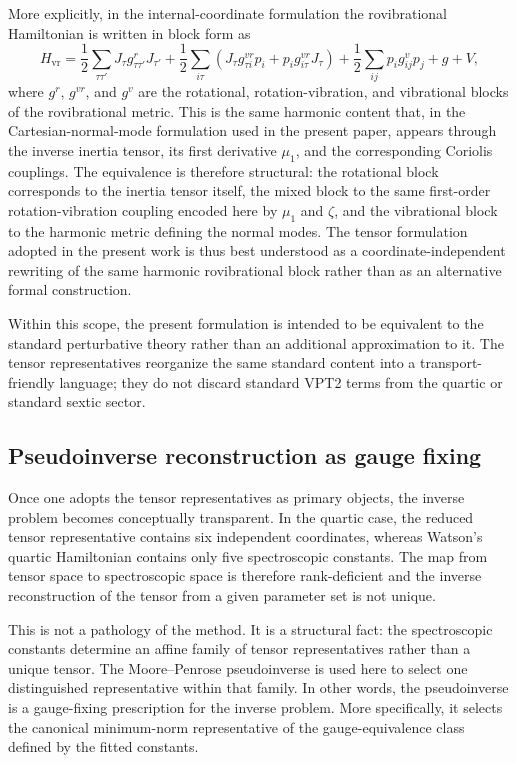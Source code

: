 \documentclass[aip,jcp,reprint,floatfix]{revtex4-2}
\begin{document}
More explicitly, in the internal-coordinate formulation the
rovibrational Hamiltonian is written in block form as
\begin{equation}
H_{\mathrm{vr}}
=
\frac12 \sum_{\tau\tau'} J_\tau g^{r}_{\tau\tau'} J_{\tau'}
+ \frac12 \sum_{i\tau}\left(J_\tau g^{vr}_{\tau i} p_i + p_i g^{vr}_{i\tau} J_\tau\right)
+ \frac12 \sum_{ij} p_i g^{v}_{ij} p_j
+ g + V,
\end{equation}
where $g^r$, $g^{vr}$, and $g^v$ are the rotational,
rotation-vibration, and vibrational blocks of the rovibrational
metric.\cite{cubic-internal_2024} This is the same harmonic
content that, in the Cartesian-normal-mode formulation used in the
present paper, appears through the inverse inertia tensor, its first
derivative $\mu_1$, and the corresponding Coriolis couplings.
The equivalence is therefore structural: the rotational block
corresponds to the inertia tensor itself, the mixed block to the same
first-order rotation-vibration coupling encoded here by $\mu_1$ and
$\zeta$, and the vibrational block to the harmonic metric defining the
normal modes. The tensor formulation adopted in the present work is
thus best understood as a coordinate-independent rewriting of the same
harmonic rovibrational block rather than as an alternative formal
construction.

Within this scope, the present formulation is intended to be
equivalent to the standard perturbative theory rather than an
additional approximation to it. The tensor representatives reorganize
the same standard content into a transport-friendly language; they do
not discard standard VPT2 terms from the quartic or standard sextic
sector.

\subsection{Pseudoinverse reconstruction as gauge fixing}

Once one adopts the tensor representatives as primary objects, the
inverse problem becomes conceptually transparent. In the quartic case,
the reduced tensor representative contains six independent
coordinates, whereas Watson's quartic Hamiltonian contains only five
spectroscopic constants. The map from tensor space to spectroscopic
space is therefore rank-deficient and the inverse reconstruction of
the tensor from a given parameter set is not unique.

This is not a pathology of the method. It is a structural fact: the
spectroscopic constants determine an affine family of tensor
representatives rather than a unique tensor. The Moore--Penrose
pseudoinverse is used here to select one distinguished representative
within that family. In other words, the pseudoinverse is a
gauge-fixing prescription for the inverse problem. More specifically,
it selects the canonical minimum-norm representative of the
gauge-equivalence class defined by the fitted constants.
\end{document}
